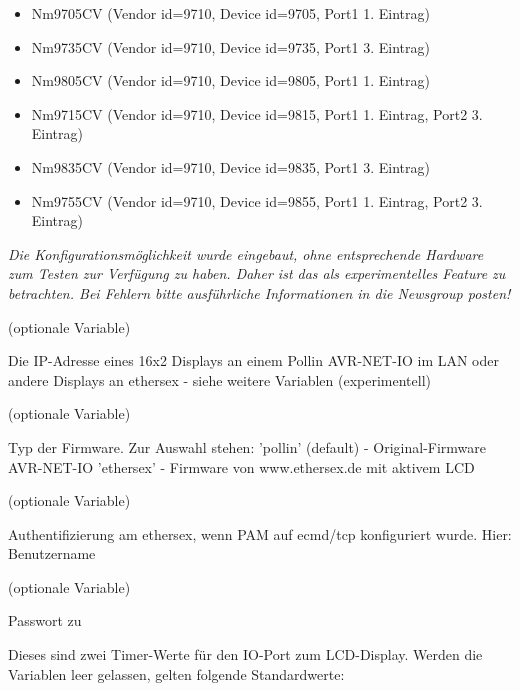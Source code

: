\begin{description}
        \begin{itemize}
        \item Nm9705CV  (Vendor id=9710, Device id=9705, Port1 1. Eintrag)
        \item Nm9735CV  (Vendor id=9710, Device id=9735, Port1 3. Eintrag)
        \item Nm9805CV  (Vendor id=9710, Device id=9805, Port1 1. Eintrag)
        \item Nm9715CV  (Vendor id=9710, Device id=9815, Port1 1. Eintrag, Port2 3. Eintrag)
        \item Nm9835CV  (Vendor id=9710, Device id=9835, Port1 3. Eintrag)
        \item Nm9755CV  (Vendor id=9710, Device id=9855, Port1 1. Eintrag, Port2 3. Eintrag)
        \end{itemize}

        \emph{Die Konfigurationsmöglichkeit wurde eingebaut, ohne entsprechende
        Hardware zum Testen zur Verfügung zu haben. Daher ist das als
        experimentelles Feature zu betrachten. Bei Fehlern bitte ausführliche
        Informationen in die Newsgroup posten!}

 (optionale Variable)

      Die IP-Adresse eines 16x2 Displays an einem Pollin AVR-NET-IO im LAN
      oder andere Displays an ethersex - siehe weitere Variablen
      (experimentell) 

 (optionale Variable)
      
      Typ der Firmware.
      Zur Auswahl stehen: 'pollin' (default) - Original-Firmware AVR-NET-IO
      'ethersex' - Firmware von www.ethersex.de mit aktivem LCD
      
 (optionale Variable)
      
      Authentifizierung am ethersex, wenn PAM auf ecmd/tcp konfiguriert wurde.
      Hier: Benutzername

 (optionale Variable)
      
      Passwort zu 
      

      Dieses sind zwei Timer-Werte für den IO-Port zum LCD-Display.
      Werden die Variablen leer gelassen, gelten folgende Standardwerte:


\end{description}
